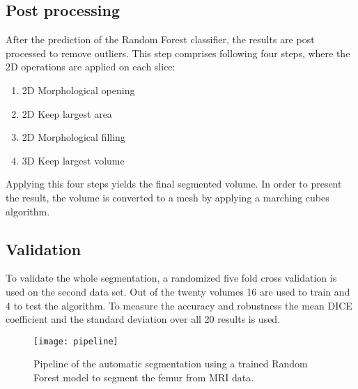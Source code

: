 \subsection{Post processing}
After the prediction of the Random Forest classifier, the results are post processed to remove outliers. This step comprises following four steps, where the 2D operations are applied on each slice:
\begin{enumerate}
\item 2D Morphological opening
\item 2D Keep largest area
\item 2D Morphological filling
\item 3D Keep largest volume
\end{enumerate}
Applying this four steps yields the final segmented volume. In order to present the result, the volume is converted to a mesh by applying a marching cubes algorithm. 
\subsection{Validation}
To validate the whole segmentation, a randomized five fold cross validation is used on the second data set. Out of the twenty volumes 16 are used to train and 4 to test the algorithm. To measure the accuracy and robustness the mean DICE coefficient and the standard deviation over all 20 results is used.
\begin{figure*}[!t]
\centering
\texttt{[image: pipeline]}
\caption{Pipeline of the automatic segmentation using a trained Random Forest model to segment the femur from MRI data.}
\label{fig:pipeline}
\end{figure*}

